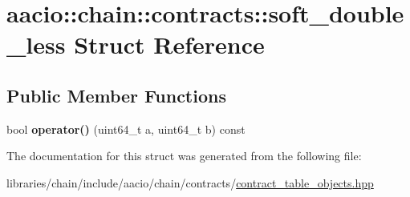 \hypertarget{structaacio_1_1chain_1_1contracts_1_1soft__double__less}{}\section{aacio\+:\+:chain\+:\+:contracts\+:\+:soft\+\_\+double\+\_\+less Struct Reference}
\label{structaacio_1_1chain_1_1contracts_1_1soft__double__less}
\subsection*{Public Member Functions}
\begin{DoxyCompactItemize}
\item 
\mbox{\label{structaacio_1_1chain_1_1contracts_1_1soft__double__less_a42ef0447174ba4ec545a6bfd22b404cd}} 
bool {\bfseries operator()} (uint64\+\_\+t a, uint64\+\_\+t b) const
\end{DoxyCompactItemize}


The documentation for this struct was generated from the following file\+:\begin{DoxyCompactItemize}
\item 
libraries/chain/include/aacio/chain/contracts/\mbox{\hyperlink{contract__table__objects_8hpp}{contract\+\_\+table\+\_\+objects.\+hpp}}\end{DoxyCompactItemize}
